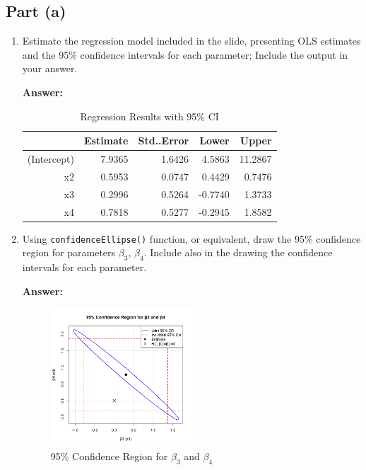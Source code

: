 \documentclass[12pt,a4paper]{article}
\begin{document}
\subsection*{Part (a)}
\begin{enumerate}[label=(\roman*)]
  \item Estimate the regression model included in the slide, presenting OLS estimates and the 95\% confidence intervals for each parameter; Include the output in your answer.
  
  \textbf{Answer:} 
 
\begin{table}[ht]
    \centering
    \caption{Regression Results with 95\% CI} 
    \label{tab:regression}
  \begin{tabular}{rrrrr}
    \hline
    & Estimate & Std..Error & Lower & Upper \\ 
    \hline
    (Intercept) & 7.9365 & 1.6426 & 4.5863 & 11.2867 \\ 
    x2 & 0.5953 & 0.0747 & 0.4429 & 0.7476 \\ 
    x3 & 0.2996 & 0.5264 & -0.7740 & 1.3733 \\ 
    x4 & 0.7818 & 0.5277 & -0.2945 & 1.8582 \\ 
    \hline
  \end{tabular}
\end{table}

  
  \item Using \texttt{confidenceEllipse()} function, or equivalent, draw the 95\% confidence region for parameters $\beta_3$, $\beta_4$. Include also in the drawing the confidence intervals for each parameter.
  
  \textbf{Answer:} 

\begin{figure}[H]  %
\centering
\includegraphics[width=0.5\textwidth]{Files/q1ii_plot.png}
\caption{95\% Confidence Region for $\beta_3$ and $\beta_4$}
\label{fig:ellipse}
\end{figure}


\end{enumerate}
\end{document}
